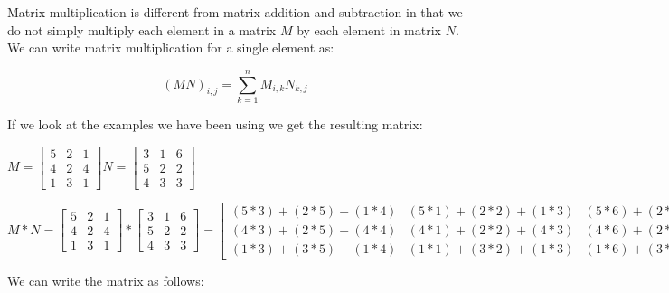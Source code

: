 \documentclass[12pt]{article}
\begin{document}
Matrix multiplication is different from matrix addition and subtraction in that we do not simply multiply each element in a matrix $M$ by each element in matrix $N$. We can write matrix multiplication for a single element as:

$$(M N)_{i, j} = \sum_{k = 1}^{n} M_{i, k}N_{k, j}$$

If we look at the examples we have been using we get the resulting matrix:
 \begin{center}
$M = \begin{bmatrix} 5 & 2 & 1 \\ 4 & 2 & 4 \\ 1 & 3 & 1 \end{bmatrix}
  N = \begin{bmatrix} 3 & 1 & 6 \\ 5 & 2 & 2 \\ 4 & 3 & 3 \end{bmatrix}
$
\end{center}
\begin{center}
$M * N =
 \begin{bmatrix} 5 & 2 & 1 \\ 4 & 2 & 4 \\ 1 & 3 & 1 \end{bmatrix}  *
  \begin{bmatrix} 3 & 1 & 6 \\  5 & 2 & 2 \\ 4 & 3 & 3 \end{bmatrix} = 
  \begin{bmatrix} (5*3) + (2*5) + (1*4) & (5*1) + (2*2) + (1*3) & (5*6) + (2*2) + (1*3) \\ 
                           (4*3) + (2*5) + (4*4) & (4*1) + (2*2) + (4*3) & (4*6) + (2*2) + (4*3) \\ 
                           (1*3) + (3*5) + (1*4) & (1*1) + (3*2) + (1*3) & (1*6) + (3*2) + (1*3) 
  \end{bmatrix} =
  \begin{bmatrix} 29 & 12 & 37 \\ 38 & 20 & 40 \\ 22 & 10 & 15 \end{bmatrix}
$
\end{center}
We can write the matrix as follows:
\end{document}

